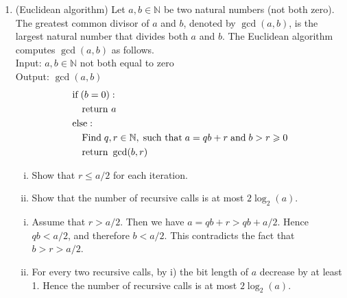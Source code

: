\documentclass[11pt]{article}
\newcommand{\setN}{\mathbb{N}}
\renewcommand{\leq}{\leqslant}
\renewcommand{\geq}{\geqslant}
\begin{document}
\begin{enumerate}[1)]
\item (Euclidean algorithm) Let $a, b ∈ \setN$ be two natural numbers (not both zero). The greatest common divisor of $a$ and $b$, denoted by $\gcd(a, b)$, is the largest natural number that divides both $a$ and $b$. The Euclidean algorithm computes $\gcd(a, b)$ as follows.\\
Input: $a, b ∈ \setN$ not both equal to zero \\
Output: $\gcd(a, b)$\\
\begin{align*}
&\text{if}\;(b = 0):\\
&\quad\text{return }a\\
&\text{else}:\\
& \quad \text{Find}\;q,r\in \N, \;\text{such that}\; a=qb + r\;\text{and}\;b>r\geq 0\\
& \quad \text{return }\gcd(b, r)
\end{align*}
\begin{enumerate}[i)]
\item Show that $r\leq a/2$ for each iteration.
\item Show that the number of recursive calls is at most $2\log_2(a)$.
\end{enumerate}

\begin{solution}
\begin{enumerate}[i)]
\item Assume that $r > a/2$. Then we have $a = qb + r > qb + a/2$. Hence $qb < a/2$, and therefore $b < a/2$. This contradicts the fact that $b > r > a/2$.
\item For every two recursive calls, by i) the bit length of $a$ decrease by at least 1. Hence the number of recursive calls is at most $2\log_2(a)$. 
\end{enumerate}
\end{solution}


\end{enumerate}
\end{document}
